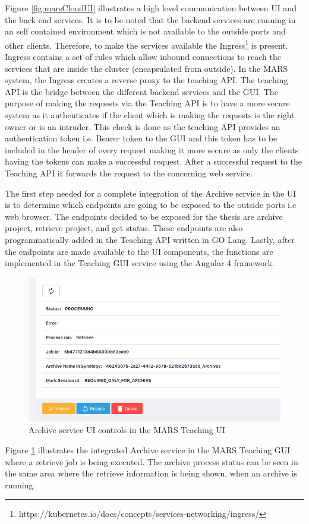 Figure \ref{fig:marsCloudUI} illustrates a high level communication between UI and the back end services. It is to be noted that the backend services
are running in an self contained environment which is not available to the outside ports and other clients. Therefore, 
to make the services available the Ingress\footnote{https://kubernetes.io/docs/concepts/services-networking/ingress/} is present. Ingress contains
a set of rules which allow inbound connections to reach the services that are inside the cluster (encapsulated from outside). In the MARS system,
the Ingress creates a reverse proxy to the teaching API. The teaching API is the bridge between the different backend services and the GUI. The purpose
of making the requests via the Teaching API is to have a more secure system as it authenticates if the client which is making the requests is the right owner or 
is an intruder. This check is done as the teaching API provides an authentication token i.e. Bearer token to the GUI and this token has to be included in the
header of every request making it more secure as only the clients having the tokens can make a successful request. After a successful request to the Teaching API
it forwards the request to the concerning web service.


The first step needed for a complete integration of the Archive service in the UI is to determine which endpoints are going to be exposed to the outside ports i.e web browser.
The endpoints decided to be exposed for the thesis are archive project, retrieve project, and get status. These endpoints are also programmatically added
in the Teaching API written in GO Lang. Lastly, after the endpoints are made available to the UI components, the functions are implemented in the Teaching GUI service
using the Angular 4 framework. 

\begin{figure}[H]
    \centering \includegraphics[scale=0.5]{grafiken/archiveUI.png}
    \caption{Archive service UI controls in the MARS Teaching UI}
    \label{fig:archiveUI}
\end{figure}

Figure \ref{fig:archiveUI} illustrates the integrated Archive service in the MARS Teaching GUI where a retrieve job is being executed. The archive process
status can be seen in the same area where the retrieve information is being shown, when an archive is running.
